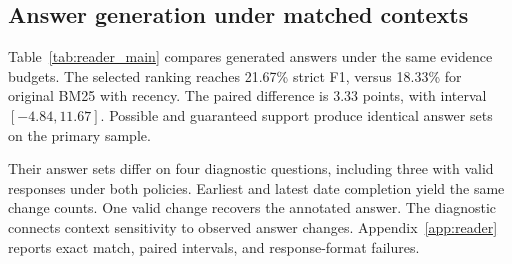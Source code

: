 \subsection{Answer generation under matched contexts}
Table~\ref{tab:reader_main} compares generated answers under the same evidence budgets.
The selected ranking reaches 21.67\% strict F1, versus 18.33\% for original BM25 with recency.
The paired difference is 3.33 points, with interval $[-4.84,11.67]$.
Possible and guaranteed support produce identical answer sets on the primary sample.


Their answer sets differ on four diagnostic questions, including three with valid responses under both policies.
Earliest and latest date completion yield the same change counts.
One valid change recovers the annotated answer.
The diagnostic connects context sensitivity to observed answer changes.
Appendix~\ref{app:reader} reports exact match, paired intervals, and response-format failures.
